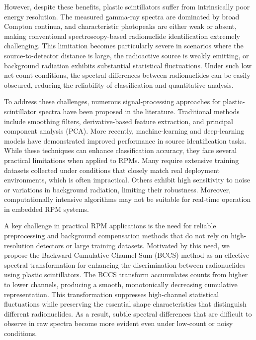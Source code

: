 \documentclass[10pt]{wlscirep}
\begin{document}
However, despite these benefits, plastic scintillators suffer from intrinsically poor energy resolution. The measured gamma-ray spectra are dominated by broad Compton continua, and characteristic photopeaks are either weak or absent, making conventional spectroscopy-based radionuclide identification extremely challenging. This limitation becomes particularly severe in scenarios where the source-to-detector distance is large, the radioactive source is weakly emitting, or background radiation exhibits substantial statistical fluctuations. Under such low net-count conditions, the spectral differences between radionuclides can be easily obscured, reducing the reliability of classification and quantitative analysis.

To address these challenges, numerous signal-processing approaches for plastic-scintillator spectra have been proposed in the literature. Traditional methods include smoothing filters, derivative-based feature extraction, and principal component analysis (PCA). More recently, machine-learning and deep-learning models have demonstrated improved performance in source identification tasks. While these techniques can enhance classification accuracy, they face several practical limitations when applied to RPMs. Many require extensive training datasets collected under conditions that closely match real deployment environments, which is often impractical. Others exhibit high sensitivity to noise or variations in background radiation, limiting their robustness. Moreover, computationally intensive algorithms may not be suitable for real-time operation in embedded RPM systems.

A key challenge in practical RPM applications is the need for reliable preprocessing and background compensation methods that do not rely on high-resolution detectors or large training datasets. Motivated by this need, we propose the Backward Cumulative Channel Sum (BCCS) method as an effective spectral transformation for enhancing the discrimination between radionuclides using plastic scintillators. The BCCS transform accumulates counts from higher to lower channels, producing a smooth, monotonically decreasing cumulative representation. This transformation suppresses high-channel statistical fluctuations while preserving the essential shape characteristics that distinguish different radionuclides. As a result, subtle spectral differences that are difficult to observe in raw spectra become more evident even under low-count or noisy conditions.
\end{document}
